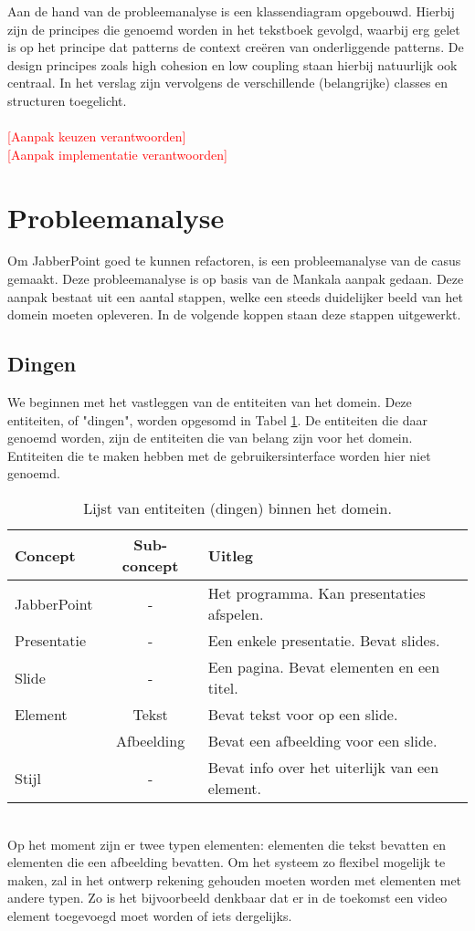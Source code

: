 \documentclass[a4paper]{article}
\newcommand{\todo}[1]{\textcolor{red}{[#1]}}
\begin{document}
Aan de hand van de probleemanalyse is een klassendiagram opgebouwd. Hierbij zijn de principes die genoemd worden in het tekstboek gevolgd, waarbij erg gelet is op het principe dat patterns de context creëren van onderliggende patterns. De design principes zoals high cohesion en low coupling staan hierbij natuurlijk ook centraal. In het verslag zijn vervolgens de verschillende (belangrijke) classes en structuren toegelicht.
\\\\
\todo{Aanpak keuzen verantwoorden}
\\
\todo{Aanpak implementatie verantwoorden}


\section{Probleemanalyse}
Om JabberPoint goed te kunnen refactoren, is een probleemanalyse van de casus gemaakt. Deze probleemanalyse is op basis van de Mankala aanpak gedaan. Deze aanpak bestaat uit een aantal stappen, welke een steeds duidelijker beeld van het domein moeten opleveren. In de volgende koppen staan deze stappen uitgewerkt.

\subsection{Dingen}
We beginnen met het vastleggen van de entiteiten van het domein. Deze entiteiten, of "dingen", worden opgesomd in Tabel \ref{table:dingen}. De entiteiten die daar genoemd worden, zijn de entiteiten die van belang zijn voor het domein. Entiteiten die te maken hebben met de gebruikersinterface worden hier niet genoemd.
\begin{table}[!h]
\centering
	\begin{tabular}{lcl}
	\toprule
 	Concept & Sub-concept & Uitleg \\ \midrule
 	JabberPoint & - & Het programma. Kan presentaties afspelen. \\
 	Presentatie & - & Een enkele presentatie. Bevat slides. \\
 	Slide & - & Een pagina. Bevat elementen en een titel.\\
 	Element & Tekst & Bevat tekst voor op een slide.\\
 	 & Afbeelding & Bevat een afbeelding voor een slide.\\
 	Stijl & - & Bevat info over het uiterlijk van een element.\\
 	\bottomrule
	\end{tabular}
\caption{Lijst van entiteiten (dingen) binnen het domein.}
\label{table:dingen}
\end{table}
\\
Op het moment zijn er twee typen elementen: elementen die tekst bevatten en elementen die een afbeelding bevatten. Om het systeem zo flexibel mogelijk te maken, zal in het ontwerp rekening gehouden moeten worden met elementen met andere typen. Zo is het bijvoorbeeld denkbaar dat er in de toekomst een video element toegevoegd moet worden of iets dergelijks.
\end{document}
